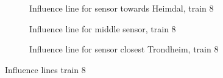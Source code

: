 \begin{figure}[htpb]
  \centering
  \begin{subfigure}[t]{0.9\textwidth}
    
    \caption{Influence line for sensor towards Heimdal, train 8}
    \label{infl_Heimdal_train8}
  \end{subfigure}
  \centering
  \begin{subfigure}[t]{0.9\textwidth}
    
    \caption{Influence line for middle sensor, train 8}
    \label{infl_middle_train8}
  \end{subfigure}
  \begin{subfigure}[t]{0.9\textwidth}
    
    \caption{Influence line for sensor closest Trondheim, train 8}
    \label{infl_Trondheim_train8}
  \end{subfigure}
  \caption{Influence lines train 8}
  \label{influence_lines_train8}
\end{figure}
